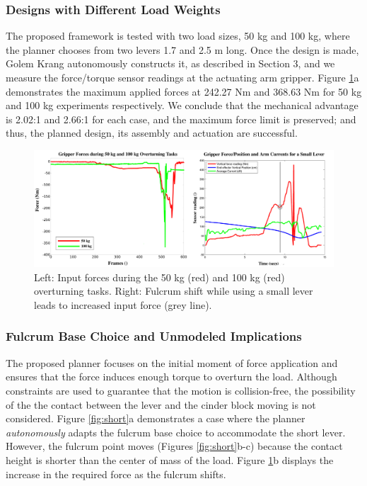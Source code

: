 \documentclass[runningheads,a4paper]{llncs}
\begin{document}
\subsubsection{Designs with Different Load Weights}

The proposed framework is tested with two 
load sizes, 50 kg and 100 kg, where the planner chooses from two levers 1.7 and 2.5
m long. Once the design is made, Golem Krang autonomously constructs it, as
described in Section 3, and we measure the force/torque sensor readings at the actuating arm gripper. Figure \ref{fig:graphs}a demonstrates the maximum applied forces at 242.27 Nm and 368.63 Nm for 50 kg and 100 kg experiments
respectively. We conclude that the mechanical advantage is 2.02:1 and 2.66:1 for each case, and 
the maximum force limit is preserved; and thus, the planned design, its assembly and actuation are
successful.

\begin{figure}[ht!] 
  \centering
  \includegraphics[width=1.0\linewidth]{Figures/loads.png}
  \caption{Left: Input forces during the 50 kg (red) and 100 kg (red) overturning tasks. 
  Right: Fulcrum shift while using a small lever leads to increased input force  (grey line).}
  
  \label{fig:graphs}
\end{figure}

\vspace{-2em}
\subsubsection{Fulcrum Base Choice and Unmodeled Implications}

The proposed planner focuses on the initial moment of force application and ensures that the force
induces enough torque to overturn the load. Although constraints are used to guarantee that the
motion is collision-free, the possibility of the the contact between
the lever and the cinder block moving is not considered. Figure \ref{fig:short}a demonstrates a case where
the planner \textit{autonomously} adapts the fulcrum base choice to accommodate the short
lever. However, the fulcrum point moves (Figures \ref{fig:short}b-c) because the contact height is
shorter than the center of mass of the load. Figure \ref{fig:graphs}b displays the increase in
the required force as the fulcrum shifts.
\end{document}
